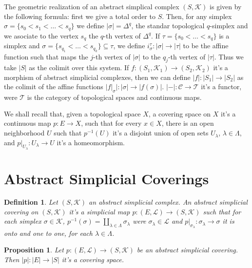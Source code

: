 \documentclass{amsart}
\newtheorem{proposition}{Proposition}[section]
\newtheorem{definition}{Definition}[section]
\begin{document}
The geometric realization of an abstract simplical complex $(S,\mathcal{K})$ is given by the following formula: first we give a total order to $S$. Then, for any simplex $\sigma=\{s_{0}<s_{1}<\ldots<s_{q}\}$ we define $|\sigma|=\Delta^{q}$, the standar topological $q$-simplex and we asociate to the vertex $s_{q}$ the $q$-th vertex of $\Delta^{q}$. If $\tau=\{s_{0}<\ldots<s_{q}\}$ is a simplex and $\sigma=\{s_{q_{1}}<\ldots<s_{q_{k}}\}\subseteq\tau$, we define $i_{\sigma}^{\tau}\colon|\sigma|\to|\tau|$ to be the affine function such that maps the $j$-th vertex of $|\sigma|$ to the $q_{j}$-th vertex of $|\tau|$. Thus we take $|S|$ as the colimit over this system. If $f\colon(S_{1},\mathcal{K}_{1})\to(S_{2},\mathcal{K}_{2})$ it's a morphism of abstract simplicial complexes, then we can define $|f|\colon|S_{1}|\to|S_{2}|$ as the colimit of the affine functions $|f|_{\sigma}|\colon|\sigma|\to|f(\sigma)|$. $|-|\colon\mathcal{C}\to\mathcal{T}$ it's a functor, were $\mathcal{T}$ is the category of topological spaces and continuous maps.


We shall recall that, given a topological space $X$, a covering space on $X$ it's a continuous map $p\colon E\to X$, such that for every $x\in X$, there is an open neighborhood $U$ such that $p^{-1}(U)$ it's a disjoint union of open sets $U_{\lambda}$, $\lambda\in\Lambda$, and $p|_{U_{\lambda}}\colon U_{\lambda}\to U$ it's a homeomorphism.

\section{Abstract Simplicial Coverings}

\begin{definition}
Let $(S,\mathcal{K})$ an abstract simplicial complex. An abstract simplicial covering on $(S,\mathcal{K})$ it's a simplicial map $p\colon(E,\mathcal{L})\to(S,\mathcal{K})$ such that for each simplex $\sigma\in\mathcal{K}$, $p^{-1}(\sigma)=\amalg_{\lambda\in\Lambda}\sigma_{\lambda}$ were $\sigma_{\lambda}\in\mathcal{L}$ and $p|_{\sigma_{\lambda}}\colon \sigma_{\lambda}\to \sigma$ it is onto and one to one, for each $\lambda\in\Lambda$.
\end{definition}

\begin{proposition}
Let $p\colon(E,\mathcal{L})\to(S,\mathcal{K})$ be an abstract simplicial covering. Then $|p|:|E|\to|S|$ it's a covering space.
\end{proposition}
\end{document}
